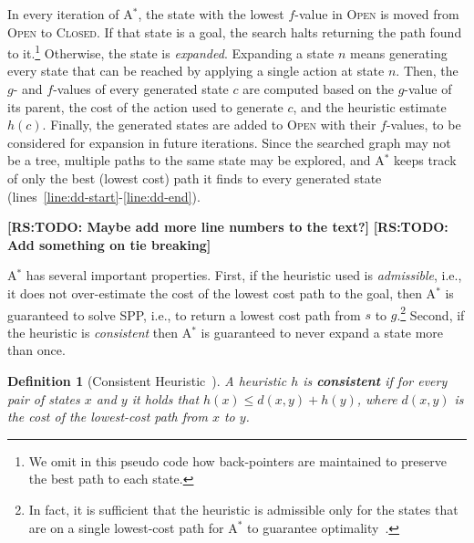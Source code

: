 \documentclass{aicom2e}
\newtheorem{definition}{Definition}
\newcommand{\astar}{A$^*$}
\newcommand{\open}{\textsc{Open}}
\newcommand{\closed}{\textsc{Closed}}
\newcommand{\roni}[1]{\textbf{[RS:#1]}}
\begin{document}
In every iteration of \astar{}, the state with the lowest $f$-value in \open{}
is moved from \open{} to \closed{}. If that state is a goal, the search halts
returning the path found to it.\footnote{We omit in this pseudo code how
back-pointers are maintained to  preserve the best path to each state.}
Otherwise, the state is {\em expanded}. Expanding a state $n$ means generating
every state that can be reached by applying a single action at state $n$. Then,
the $g$- and $f$-values of every generated state $c$ are computed based on the
$g$-value of its parent, the cost of the action used to generate $c$, and the
heuristic estimate $h(c)$. Finally, the generated states are added to \open{}
with their $f$-values, to be considered for expansion in future iterations.
Since the searched graph may not be a tree, multiple paths to the same state
may be explored, and \astar{} keeps track of only the best (lowest cost) path
it finds to every generated state
(lines~\ref{line:dd-start}-\ref{line:dd-end}).


\roni{TODO: Maybe add more line numbers to the text?}
\roni{TODO: Add something on tie breaking}


\astar{} has several important properties. First, if the heuristic used is {\em
admissible}, i.e., it does not over-estimate the cost of the lowest cost path
to the goal, then \astar{} is guaranteed to solve SPP, i.e., to return a lowest
cost path from $s$ to $g$.\footnote{In fact, it is sufficient that the
heuristic is admissible only for the states that are on a single lowest-cost
path for \astar{} to guarantee
optimality~\cite{karpas2012optimal,dechter1985generalizedBestFirst}.} Second,
if the heuristic is {\em consistent} then \astar{} is guaranteed to never
expand a state more than once.
\begin{definition}[Consistent Heuristic~\cite{hartNR68Astar}]
    A heuristic $h$ is {\bf consistent} if for every pair of states $x$ and $y$
    it holds that $h(x)\leq d(x,y)+h(y)$, where $d(x, y)$ is
    the cost of the lowest-cost path from $x$ to $y$.
    \label{def:consistent}
\end{definition}



\end{document}
